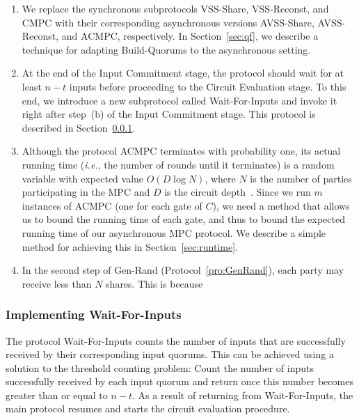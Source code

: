 \documentclass[11pt,letter]{article}
\newcommand{\ie}{\emph{i.e.}}
\newcommand{\alg}[1]{\mbox{\textsf{#1}}}
\theoremstyle{mytheoremstyle}
\begin{document}
\begin{enumerate}
	\item We replace the synchronous subprotocols \alg{VSS-Share}, \alg{VSS-Reconst}, and \alg{CMPC} with their corresponding asynchronous versions \alg{AVSS-Share}, \alg{AVSS-Reconst}, and \alg{ACMPC}, respectively. In Section~\ref{sec:qf}, we describe a technique for adapting \alg{Build-Quorums} to the asynchronous setting.
	
	\item At the end of the Input Commitment stage, the protocol should wait for at least $n-t$ inputs before proceeding to the Circuit Evaluation stage. To this end, we introduce a new subprotocol called \alg{Wait-For-Inputs} and invoke it right after step~(b) of the Input Commitment stage. This protocol is described in Section~\ref{sec:waitforinputs}.
	
	\item Although the protocol \alg{ACMPC} terminates with probability one, its actual running time (\ie, the number of rounds until it terminates) is a random variable with expected value $O(D\log{N})$, where $N$ is the number of parties participating in the MPC and $D$ is the circuit depth~\cite{benor_canetti_goldreich:asynchronous}. Since we run $m$ instances of \alg{ACMPC} (one for each gate of $C$), we need a method that allows us to bound the running time of each gate, and thus to bound the expected running time of our asynchronous MPC protocol. We describe a simple method for achieving this in Section~\ref{sec:runtime}.
	
	\item In the second step of \alg{Gen-Rand} (Protocol~\ref{pro:GenRand}), each party may receive less than $N$ shares. This is because  
\end{enumerate}

\subsubsection{Implementing \alg{Wait-For-Inputs}} \label{sec:waitforinputs}
The protocol \alg{Wait-For-Inputs} counts the number of inputs that are successfully received by their corresponding input quorums. This can be achieved using a solution to the threshold counting problem: Count the number of inputs successfully received by each input quorum and return once this number becomes greater than or equal to $n-t$. As a result of returning from \alg{Wait-For-Inputs}, the main protocol resumes and starts the circuit evaluation procedure.
\end{document}
